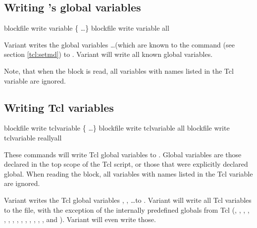 
\subsection{Writing \es's global variables}

\begin{essyntax}
   blockfile  
  write variable \{  \dots \}
   blockfile  write variable all
\end{essyntax}

Variant  writes the global variables 
 \dots (which are known to the  command (see
section \vref{tcl:setmd}) to . Variant  will
write all known global variables.

Note, that when the block is read, all variables with names listed in
the Tcl variable  are ignored.

\subsection{Writing Tcl variables}

\begin{essyntax}
   blockfile  write tclvariable \{
    \dots \}
   blockfile  write tclvariable all
   blockfile  write tclvariable reallyall
\end{essyntax}

These commands will write Tcl global variables to .
Global variables are those declared in the top scope of the Tcl
script, or those that were explicitly declared global.  When reading
the block, all variables with names listed in the Tcl variable
 are ignored.

Variant  writes the Tcl global variables ,
, \dots to . Variant  will write
all Tcl variables to the file, with the exception of the internally
predefined globals from Tcl (, ,
, , , ,
, , , ,
, , , ,
 and ). Variant  will
even write those.

